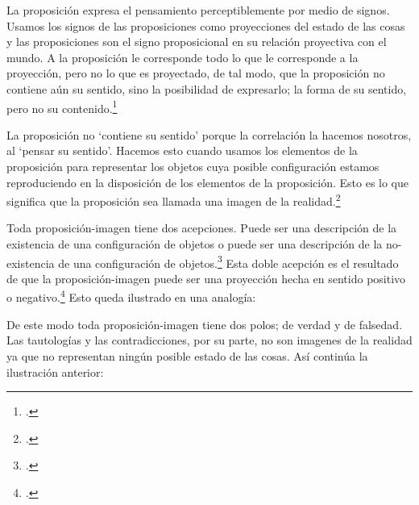     La proposición expresa el pensamiento perceptiblemente por medio de signos.
    Usamos los signos de las proposiciones como proyecciones del estado de las cosas
    y las proposiciones son el signo proposicional en su relación proyectiva con el
    mundo. A la proposición le corresponde todo lo que le corresponde a la
    proyección, pero no lo que es proyectado, de tal modo, que la proposición no
    contiene aún su sentido, sino la posibilidad de expresarlo; la forma de su
    sentido, pero no su contenido.\footcite[cf.~][3.1,3.11-3.13]{tractatus} 

    La proposición no `contiene su sentido' porque la correlación la hacemos nosotros,
    al `pensar su sentido'. Hacemos esto cuando usamos los elementos de la
    proposición para representar los objetos cuya posible configuración estamos 
    reproduciendo en la disposición de los elementos de la proposición. Esto es lo
    que significa que la proposición sea llamada una imagen de la
    realidad.\footcite[cf.~][p.69]{IWT}  

    Toda proposición-imagen tiene dos acepciones. Puede ser una descripción de
    la existencia de una configuración de objetos o puede ser una descripción de la
    no-existencia de una configuración de objetos.\footcite[cf.~][p.~72]{IWT} 
    Esta doble acepción es el resultado de que la proposición-imagen puede ser una
    proyección hecha en sentido positivo o negativo.\footcite[cf.~][p.~74]{IWT} Esto
    queda ilustrado en una analogía:


    De este modo toda proposición-imagen tiene dos polos; de verdad y de falsedad.
    Las tautologías y las contradicciones, por su parte, no son imagenes de la
    realidad ya que no representan ningún posible estado de las cosas. Así continúa
    la ilustración anterior:

